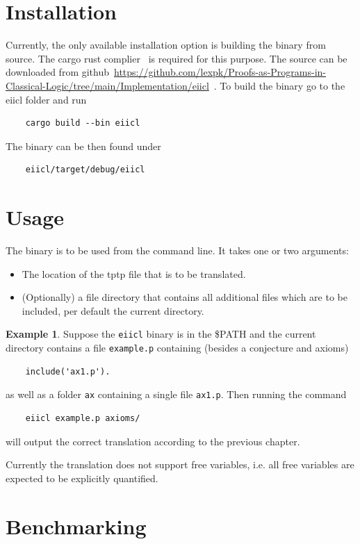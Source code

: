 \documentclass[a4paper,11pt]{report}
\theoremstyle{definition}
\theoremstyle{definition}
\theoremstyle{definition}
\theoremstyle{definition}
\theoremstyle{definition}
\theoremstyle{definition}
\newtheorem{example}[theorem]{Example}
\theoremstyle{definition}
\begin{document}
	\section{Installation}
	
	Currently, the only available installation option is building the binary from source. The cargo rust complier~\cite{rust} is required for this purpose. The source can be downloaded from github~\url{https://github.com/lexpk/Proofs-as-Programs-in-Classical-Logic/tree/main/Implementation/eiicl}~\cite{implementation}. To build the binary go to the eiicl folder and run
	\begin{lstlisting}
	cargo build --bin eiicl
	\end{lstlisting}
	The binary can be then found under 
	\begin{lstlisting}
	eiicl/target/debug/eiicl
	\end{lstlisting}
	
	\section{Usage}
	
	The binary is to be used from the command line. It takes one or two arguments:
	\begin{itemize}
		\item The location of the tptp file that is to be translated.
		\item (Optionally) a file directory that contains all additional files which are to be included, per default the current directory.
	\end{itemize}
	\begin{example}
		Suppose the \lstinline|eiicl| binary is in the \$PATH and the current directory contains a file \lstinline|example.p| containing (besides a conjecture and axioms)
		\begin{lstlisting}
	include('ax1.p').
		\end{lstlisting}
		as well as a folder \lstinline|ax| containing a single file \lstinline|ax1.p|.
	Then running the command
	\begin{lstlisting}
 	eiicl example.p axioms/
	\end{lstlisting}
	will output the correct translation according to the previous chapter.
	\end{example}
	Currently the translation does not support free variables, i.e. all free variables are expected to be explicitly quantified.
	
	\section{Benchmarking}
	
\end{document}
